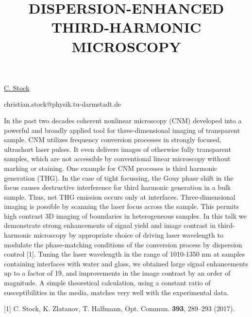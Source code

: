 \title{DISPERSION-ENHANCED THIRD-HARMONIC MICROSCOPY}

\underline{C. Stock} 

{\normalsize{\vspace{-4mm}
\darmstadt

\email christian.stock@physik.tu-darmstadt.de}}

In the past two decades coherent nonlinear microscopy (CNM) developed into a powerful and broadly applied tool for three-dimensional imaging of transparent sample. CNM utilizes frequency conversion processes in strongly focused, ultrashort laser pulses. It even delivers images of otherwise fully transparent samples, which are not accessible by conventional linear microscopy without marking or staining. One example for CNM processes is third harmonic generation (THG). In the case of tight focussing, the Gouy phase shift in the focus causes destructive interference for third harmonic generation in a bulk sample. Thus, net THG emission occurs only at interfaces. Three-dimensional imaging is possible by scanning the laser focus across the sample. This permits high contrast 3D imaging of boundaries in heterogeneous samples.
In this talk we demonstrate strong enhancements of signal yield and image contrast in third-harmonic microscopy by appropriate choice of driving laser wavelength to modulate the phase-matching conditions of the conversion process by dispersion control [1]. Tuning the laser wavelength in the range of 1010-1350 nm at samples containing interfaces with water and glass, we obtained large signal enhancements up to a factor of 19, and improvements in the image contrast by an order of magnitude. A simple theoretical calculation, using a constant ratio of susceptibilities in the media, matches very well with the experimental data.

{\normalsize
[1] C. Stock, K. Zlatanov, T. Halfmann, Opt. Commun. \textbf{393}, 289–293 (2017).
}

\vspace{\baselineskip} 